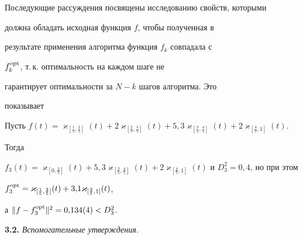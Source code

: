 Последующие рассуждения посвящены исследованию свойств, которыми


должна обладать исходная функция $f$, чтобы полученная в


результате применения алгоритма функция $f_k$ совпадала с


$f_k^{\operatorname{opt}}$, т.\,к. оптимальность на каждом шаге не


гарантирует оптимальности за $N-k$ шагов алгоритма. Это


показывает





\begin{exam}


Пусть $f(t)=\varkappa_{[\frac{1}{5},\frac{2}{5}]}(t)+


2\varkappa_{[\frac{2}{5},\frac{3}{5}]}(t)+


5{,}3\varkappa_{[\frac{3}{5},\frac{4}{5}]}(t)


+2\varkappa_{[\frac{4}{5},1]}(t)$.


Тогда


$f_3(t)=\varkappa_{[0,\frac{3}{5}]}(t)+


5{,}3\varkappa_{[\frac{3}{5},\frac{4}{5}]}(t)


+2\varkappa_{[\frac{4}{5},1]}(t)$ и $D_3^2=0{,}4$, но при этом


$f_3^{\opt}=\varkappa_{[\frac{1}{5},\frac{2}{5}]}(t)+


3{,}1\varkappa_{[\frac{2}{5},1]}(t)$,


а $\|f-f_3^{\operatorname{opt}}\|^2=0{,}134(4)<D_3^2$.


\end{exam}





{\bf 3.2.} {\it Вспомогательные утверждения.}





